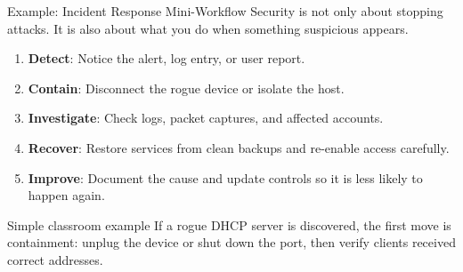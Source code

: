 \documentclass[aspectratio=169]{beamer}  %
\begin{document}
\begin{frame}{Example: Incident Response Mini-Workflow}
    \footnotesize
    Security is not only about stopping attacks. It is also about what you do when something suspicious appears.

    \vspace{0.4em}
    \begin{enumerate}
        \item \textbf{Detect}: Notice the alert, log entry, or user report.
        \item \textbf{Contain}: Disconnect the rogue device or isolate the host.
        \item \textbf{Investigate}: Check logs, packet captures, and affected accounts.
        \item \textbf{Recover}: Restore services from clean backups and re-enable access carefully.
        \item \textbf{Improve}: Document the cause and update controls so it is less likely to happen again.
    \end{enumerate}

    \begin{exampleblock}{Simple classroom example}
        \footnotesize
        If a rogue DHCP server is discovered, the first move is containment: unplug the device or shut down the port, then verify clients received correct addresses.
    \end{exampleblock}
\end{frame}
\end{document}
